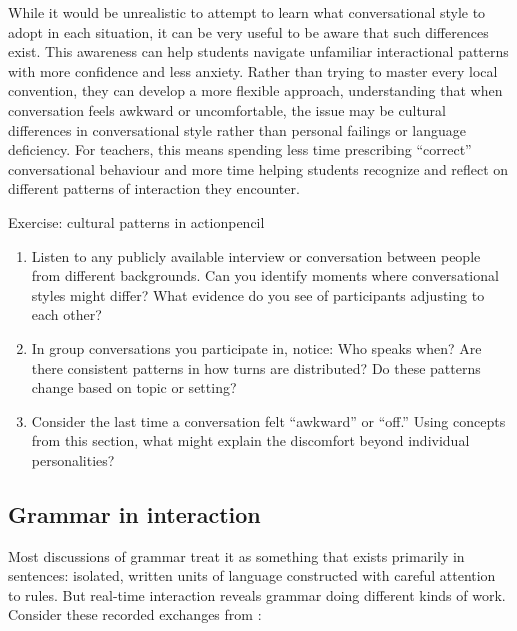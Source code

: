 While it would be unrealistic to attempt to learn what conversational style to adopt in each situation, it can be very useful to be aware that such differences exist. This awareness can help students navigate unfamiliar interactional patterns with more confidence and less anxiety. Rather than trying to master every local convention, they can develop a more flexible approach, understanding that when conversation feels awkward or uncomfortable, the issue may be cultural differences in conversational style rather than personal failings or language deficiency. For teachers, this means spending less time prescribing \enquote{correct} conversational behaviour and more time helping students recognize and reflect on different patterns of interaction they encounter.

\begin{tblsframedsymbol}{Exercise: cultural patterns in action}{pencil}
\begin{enumerate}[noitemsep, leftmargin=*]
    \item Listen to any publicly available interview or conversation between people from different backgrounds. Can you identify moments where conversational styles might differ? What evidence do you see of participants adjusting to each other?
    \item In group conversations you participate in, notice: Who speaks when? Are there consistent patterns in how turns are distributed? Do these patterns change based on topic or setting?
    \item Consider the last time a conversation felt \enquote{awkward} or \enquote{off.} Using concepts from this section, what might explain the discomfort beyond individual personalities?
\end{enumerate}
\end{tblsframedsymbol}

\subsection{Grammar in interaction} \label{subsec:grammar-interaction}

Most discussions of grammar treat it as something that exists primarily in sentences: isolated, written units of language constructed with careful attention to rules. But real-time interaction reveals grammar doing different kinds of work. Consider these recorded exchanges from \citet{lerner1991}:

